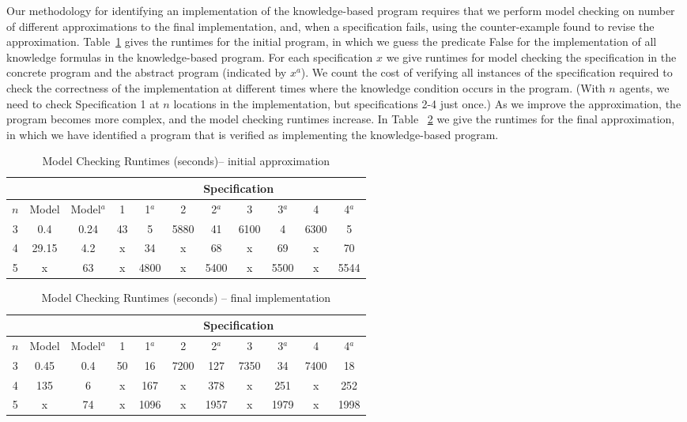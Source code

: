 \documentclass[]{llncs}
\begin{document}
Our methodology for identifying an implementation of the knowledge-based program 
requires that we perform model checking on number of different approximations to the 
final implementation, and, when a specification fails, using the counter-example found to revise the approximation. 
Table~\ref{table:results-initial} gives the runtimes for the initial program, in which we 
guess the predicate False for the implementation of all knowledge formulas in the
knowledge-based program. For each specification $x$ we give runtimes 
for model checking the specification in the concrete program and the abstract program (indicated by $x^a$). 
We count the cost of verifying all instances of the specification required to check the 
correctness of the implementation at different times where the knowledge condition 
occurs in the program. (With $n$ agents, we need to check 
Specification 1 at $n$ locations in the implementation, but specifications  2-4 just once.)  
As we improve the approximation, the program becomes more complex, 
and the model checking runtimes increase. In Table ~\ref{table:results-final} we give the 
runtimes for the final approximation, in which we have identified a program that is verified
as implementing the knowledge-based program. 
 
\begin{table}[h]
\begin{center} 
\begin{tabular}{|c||c|c||c|c||c|c||c|c||c|c|} 
\hline 
\multicolumn{3}{|c|}{} & \multicolumn{8}{c|}{Specification} \\
\hline 
$n$  & Model & Model$^a$ & 1 & 1$^a$ & 2 & 2$^a$ & 3 & 3$^a$ &  4 & 4$^a$  \\
\hline 
3 & 0.4 & 0.24& 43& 5 & 5880 & 41 & 6100 & 4 & 6300 & 5 \\ 
4 & 29.15& 4.2 & x & 34 &x & 68 & x & 69 & x & 70 \\ 
5 & x& 63& x& 4800& x&5400 & x& 5500& x& 5544\\  
\hline 
\end{tabular} 
\end{center} 
\caption{Model Checking Runtimes (seconds)-- initial approximation \label{table:results-initial}}
\end{table} 
\begin{table}[h]
\begin{center} 
\begin{tabular}{|c||c|c||c|c||c|c||c|c||c|c|} 
\hline 
\multicolumn{3}{|c|}{} & \multicolumn{8}{c|}{Specification} \\
\hline 
$n$  & Model & Model$^a$ & 1 & 1$^a$ & 2 & 2$^a$ & 3 & 3$^a$ &  4 & 4$^a$ \\
\hline 
3 & 0.45 & 0.4& 50 & 16 & 7200 &127 & 7350& 34& 7400& 18\\ 
4 & 135& 6& x &167& x & 378& x & 251& x & 252 \\ 
5 &x & 74& x& 1096 & x& 1957 & x& 1979&x &1998 \\  
\hline 
\end{tabular} 
\end{center} 
\caption{Model Checking Runtimes (seconds) -- final implementation \label{table:results-final}}
\end{table} 
\end{document}

